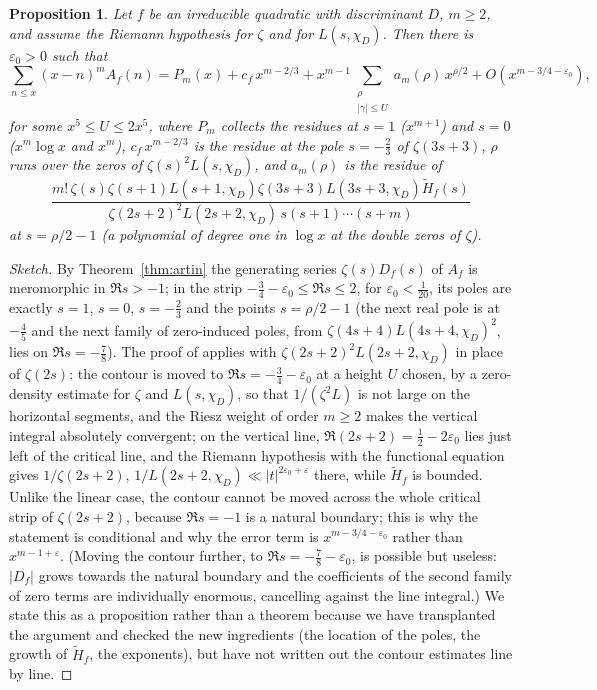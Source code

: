 \documentclass[11pt,a4paper]{article}
\newtheorem{proposition}[theorem]{Proposition}
\theoremstyle{remark}\newtheorem{remark}[theorem]{Remark}
\begin{document}
\begin{proposition}\label{thm:explicit}
Let $f$ be an irreducible quadratic with discriminant $D$, $m\ge2$, and assume the Riemann hypothesis for
$\zeta$ and for $L(s,\chi_D)$. Then there is $\varepsilon_0>0$ such that
\[
\sum_{n\le x}(x-n)^mA_f(n)=P_m(x)+c_f\,x^{m-2/3}+x^{m-1}\sum_{\substack{\rho\\|\gamma|\le U}}a_m(\rho)\,x^{\rho/2}+O(x^{m-3/4-\varepsilon_0}),
\]
for some $x^5\le U\le2x^5$, where $P_m$ collects the residues at $s=1$ ($x^{m+1}$) and $s=0$
($x^m\log x$ and $x^m$), $c_f\,x^{m-2/3}$ is the residue at the pole $s=-\tfrac23$ of $\zeta(3s+3)$,
$\rho$ runs over the zeros of $\zeta(s)^2L(s,\chi_D)$, and $a_m(\rho)$ is the residue of
\[
\frac{m!\,\zeta(s)\zeta(s+1)L(s+1,\chi_D)\zeta(3s+3)L(3s+3,\chi_D)\tilde H_f(s)}{\zeta(2s+2)^2L(2s+2,\chi_D)\,s(s+1)\cdots(s+m)}
\]
at $s=\rho/2-1$ (a polynomial of degree one in $\log x$ at the double zeros of $\zeta$).
\end{proposition}

\begin{proof}[Sketch]
By Theorem~\ref{thm:artin} the generating series $\zeta(s)D_f(s)$ of $A_f$ is meromorphic in $\Re s>-1$;
in the strip $-\tfrac34-\varepsilon_0\le\Re s\le2$, for $\varepsilon_0<\tfrac1{20}$, its poles are exactly
$s=1$, $s=0$, $s=-\tfrac23$ and the points $s=\rho/2-1$ (the next real pole is at $-\tfrac45$ and the next
family of zero-induced poles, from $\zeta(4s+4)L(4s+4,\chi_D)^2$, lies on $\Re s=-\tfrac78$). The proof of
\cite[Theorem~1]{GoldstonSuriajaya2021} applies with $\zeta(2s+2)^2L(2s+2,\chi_D)$ in place of
$\zeta(2s)$: the contour is moved to $\Re s=-\tfrac34-\varepsilon_0$ at a height $U$ chosen, by a
zero-density estimate for $\zeta$ and $L(s,\chi_D)$, so that $1/(\zeta^2L)$ is not large on the horizontal
segments, and the Riesz weight of order $m\ge2$ makes the vertical integral absolutely convergent; on the
vertical line, $\Re(2s+2)=\tfrac12-2\varepsilon_0$ lies just left of the critical line, and the Riemann
hypothesis with the functional equation gives $1/\zeta(2s+2)$, $1/L(2s+2,\chi_D)\ll|t|^{2\varepsilon_0+\varepsilon}$
there, while $\tilde H_f$ is bounded. Unlike the linear case, the contour cannot be moved across the
whole critical strip of $\zeta(2s+2)$, because $\Re s=-1$ is a natural boundary; this is why the
statement is conditional and why the error term is $x^{m-3/4-\varepsilon_0}$ rather than $x^{m-1+\varepsilon}$.
(Moving the contour further, to $\Re s=-\tfrac78-\varepsilon_0$, is possible but useless: $|D_f|$ grows
towards the natural boundary and the coefficients of the second family of zero terms are individually
enormous, cancelling against the line integral.) We state this as a proposition rather than a theorem
because we have transplanted the argument and checked the new ingredients (the location of the poles,
the growth of $\tilde H_f$, the exponents), but have not written out the contour estimates line by line.
\end{proof}
\end{document}
